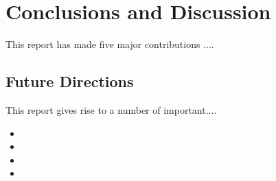 \chapter{Conclusions and Discussion}\label{final}
This report has made five major contributions ....
\section*{Future Directions}
This report gives rise to a number of important....
\begin{itemize}
\item
\item 
\item 
\item
 \end{itemize}

